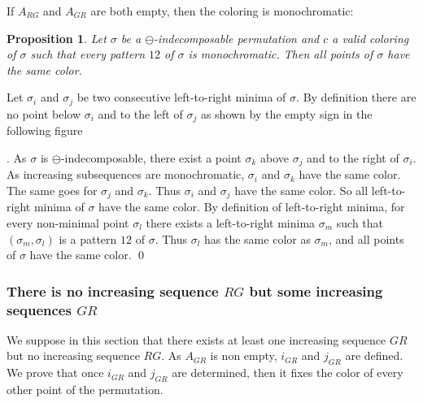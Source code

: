 \documentclass[11pt]{article}
\newenvironment{pf}{{\em \noindent Proof:}}{ \hfill \qed\smallskip}
\newtheorem{prop}[thm]{Proposition}
\newcommand{\ascentRG}{increasing sequence $RG$\xspace}
\newcommand{\ascentGR}{increasing sequence $GR$\xspace}
\newcommand{\ascentsGR}{increasing sequences $GR$\xspace}
\begin{document}
If $A_{RG}$ and $A_{GR}$ are both empty, then the coloring is monochromatic:
\begin{prop}\label{prop:monochromatic}
Let $\sigma$ be a $\ominus$-indecomposable permutation and $c$ a valid coloring of $\sigma$ such that every pattern $12$ of $\sigma$ is monochromatic. 
Then all points of $\sigma$ have the same color.
\end{prop}
\begin{pf}
Let $\sigma_i$ and $\sigma_j$ be two consecutive left-to-right minima of $\sigma$. 
By definition there are no point below $\sigma_i$ and to the left of $\sigma_j$ as shown by the empty sign in the following figure
.
As $\sigma$ is $\ominus$-indecomposable, there exist a point $\sigma_k$ above $\sigma_j$ and to the right of $\sigma_i$. 
As increasing subsequences are monochromatic, $\sigma_i$ and $\sigma_k$ have the same color. 
The same goes for $\sigma_j$ and $\sigma_k$. Thus $\sigma_i$ and $\sigma_j$ have the same color. 
So all left-to-right minima of $\sigma$ have the same color.
By definition of left-to-right minima, for every non-minimal point $\sigma_l$ there exists a left-to-right minima $\sigma_m$ such that $(\sigma_m,\sigma_l)$ is a pattern $12$ of $\sigma$. 
Thus $\sigma_l$ has the same color as $\sigma_m$, and all points of $\sigma$ have the same color.
\end{pf}


\subsubsection{There is no \ascentRG but some \ascentsGR}

We suppose in this section that there exists at least one \ascentGR but no \ascentRG.
As $A_{GR}$ is non empty, $i_{GR}$ and $j_{GR}$ are defined.
We prove that once $i_{GR}$ and $j_{GR}$ are determined, then it fixes the color of every other point of the permutation.
\end{document}
